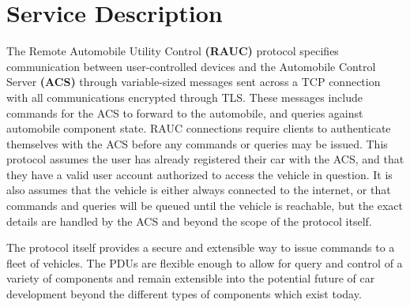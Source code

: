 \section{Service Description}
\label{sec:serv_desc}

The Remote Automobile Utility Control \textbf{(RAUC)} protocol specifies communication between user-controlled devices and the Automobile Control Server \textbf{(ACS)} through variable-sized messages sent across a TCP connection with all communications encrypted through TLS. These messages include commands for the ACS to forward to the automobile, and queries against automobile component state. RAUC connections require clients to authenticate themselves with the ACS before any commands or queries may be issued. This protocol assumes the user has already registered their car with the ACS, and that they have a valid user account authorized to access the vehicle in question. It is also assumes that the vehicle is either always connected to the internet, or that commands and queries will be queued until the vehicle is reachable, but the exact details are handled by the ACS and beyond the scope of the protocol itself.

The protocol itself provides a secure and extensible way to issue commands to a fleet of vehicles. The PDUs are flexible enough to allow for query and control of a variety of components and remain extensible into the potential future of car development beyond the different types of components which exist today.
